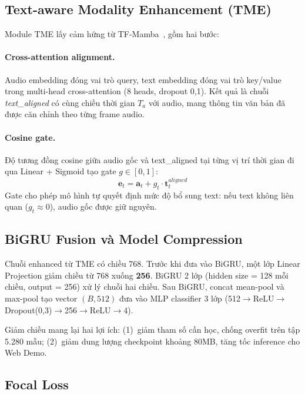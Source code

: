 \documentclass[runningheads]{llncs}
\begin{document}
\subsection{Text-aware Modality Enhancement (TME)}
\label{sec:tme}

Module TME lấy cảm hứng từ TF-Mamba~\cite{tfmamba2025}, gồm hai bước:

\paragraph{Cross-attention alignment.}
Audio embedding đóng vai trò query, text embedding đóng vai trò key/value
trong multi-head cross-attention (8 heads, dropout 0,1).
Kết quả là chuỗi \textit{text\_aligned} có cùng chiều thời gian $T_a$ với
audio, mang thông tin văn bản đã được căn chỉnh theo từng frame audio.

\paragraph{Cosine gate.}
Độ tương đồng cosine giữa audio gốc và text\_aligned tại từng vị trí thời
gian đi qua Linear + Sigmoid tạo gate $g \in [0, 1]$:
\begin{equation}
\mathbf{e}_t = \mathbf{a}_t + g_t \cdot \mathbf{t}^{aligned}_t
\label{eq:tme}
\end{equation}
Gate cho phép mô hình tự quyết định mức độ bổ sung text: nếu text không
liên quan ($g_t \approx 0$), audio gốc được giữ nguyên.

\subsection{BiGRU Fusion và Model Compression}
\label{sec:fusion}

Chuỗi enhanced từ TME có chiều 768. Trước khi đưa vào BiGRU, một lớp
Linear Projection giảm chiều từ 768 xuống \textbf{256}. BiGRU 2 lớp (hidden
size = 128 mỗi chiều, output = 256) xử lý chuỗi hai chiều.
Sau BiGRU, concat mean-pool và max-pool tạo vector $(B, 512)$ đưa vào
MLP classifier 3 lớp (512$\to$ReLU$\to$Dropout(0,3)$\to$256$\to$ReLU$\to$4).

Giảm chiều mang lại hai lợi ích: (1)~giảm tham số cần học, chống overfit
trên tập 5.280 mẫu; (2)~giảm dung lượng checkpoint khoảng 80MB, tăng tốc
inference cho Web Demo.

\subsection{Focal Loss}
\label{sec:focal}
\end{document}
